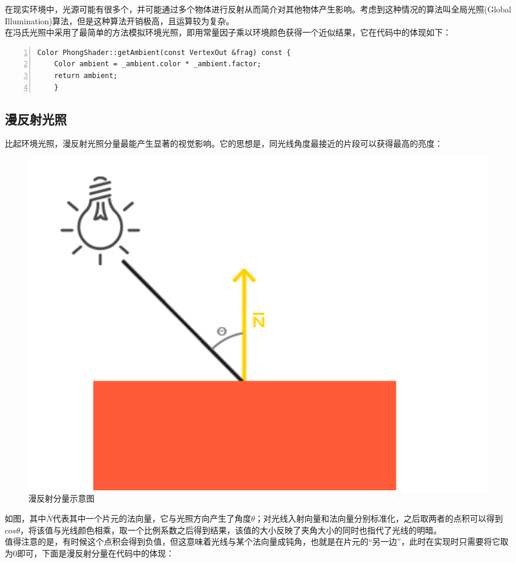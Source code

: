 \begin{spacing}{2.5}
    在现实环境中，光源可能有很多个，并可能通过多个物体进行反射从而简介对其他物体产生影响。考虑到这种情况的算法叫全局光照(Global Illumination)算法，但是这种算法开销极高，且运算较为复杂。\\
    在冯氏光照中采用了最简单的方法模拟环境光照，即用常量因子乘以环境颜色获得一个近似结果，它在代码中的体现如下：
   
   
	\begin{lstlisting}[language={[ANSI]C},numbers=left,numberstyle=\tiny,%frame=shadowbox,
   rulesepcolor=\color{red!20!green!20!blue!20},
   keywordstyle=\color{blue!70!black},
   commentstyle=\color{blue!90!},
   basicstyle=\ttfamily]
	Color PhongShader::getAmbient(const VertexOut &frag) const {
    Color ambient = _ambient.color * _ambient.factor;
    return ambient;
	}
	\end{lstlisting}
	
	\subsection{漫反射光照}
	
	比起环境光照，漫反射光照分量最能产生显著的视觉影响。它的思想是，同光线角度最接近的片段可以获得最高的亮度：
	
	\begin{figure}[H]
    	\centering
		\includegraphics[width=1.0\textwidth]{images/diffuse_light.png}
		\caption{漫反射分量示意图}
		\label{diffuse_light}
    \end{figure}
	
	如图，其中$\overline N$代表其中一个片元的法向量，它与光照方向产生了角度$\theta$；对光线入射向量和法向量分别标准化，之后取两者的点积可以得到$cos\theta$，将该值与光线颜色相乘，取一个比例系数之后得到结果，该值的大小反映了夹角大小的同时也指代了光线的明暗。\\
	值得注意的是，有时候这个点积会得到负值，但这意味着光线与某个法向量成钝角，也就是在片元的“另一边”，此时在实现时只需要将它取为0即可，下面是漫反射分量在代码中的体现：
	

\end{spacing}
